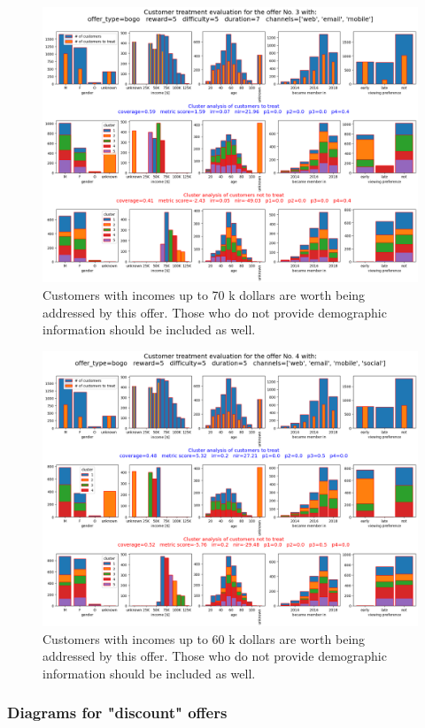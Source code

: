\documentclass[11pt]{article} %
\begin{document}
\begin{figure}[H]
\includegraphics[height=0.5\textheight]{results/results3.png}
\caption{Customers with  incomes up to 70 k dollars are worth being addressed by this offer. Those who do not provide demographic information should be included as well. }
\end{figure}
\begin{figure}[H]
\includegraphics[height=0.5\textheight]{results/results4.png}
\caption{Customers with  incomes up to 60 k dollars are worth being addressed by this offer. Those who do not provide demographic information should be included as well. }
\end{figure}
\subsubsection{Diagrams for "discount" offers}
\end{document}
